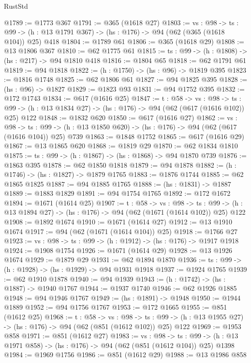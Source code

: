 \begin{lexlean}{RustStd}
\begin{coremodule}
@1789 := @1773 @367
@1791 := @365 (@1618 @27)
@1803 := {vs : @98} ->
  {ts : @99} -> (h : @13 @1791 @367) -> (hs : @176) -> @94 (@62 (@365 (@1618 @104)) @25) @418
@1804 := @1789 @61
@1806 := @365 (@1618 @29)
@1808 := @13 @1806 @367
@1810 := @62 @1775 @61
@1815 := {ts : @99} -> (h : @1808) -> (hs : @217) -> @94 @1810 @418
@1816 := @1804 @65
@1818 := @62 @1791 @61
@1819 := @94 @1818
@1822 := (h : @1750) -> (hs : @96) -> @1819 @395
@1823 := @1816 @1748
@1825 := @62 @1806 @61
@1827 := @94 @1825 @395
@1828 := (hs : @96) -> @1827
@1829 := @1823 @93
@1831 := @94 @1752 @395
@1832 := @172 @1743
@1834 := @617 (@1616 @25)
@1847 := {t : @58} ->
  {vs : @98} ->
  {ts : @99} -> (h : @13 @1834 @27) -> (hs : @176) -> @94 (@62 (@617 (@1616 @102)) @25) @122
@1848 := @1832 @620
@1850 := @617 (@1616 @27)
@1862 := {vs : @98} ->
  {ts : @99} -> (h : @13 @1850 @620) -> (hs : @176) -> @94 (@62 (@617 (@1616 @104)) @25) @739
@1863 := @1848 @1752
@1865 := @617 (@1616 @29)
@1867 := @13 @1865 @620
@1868 := @1819 @29
@1870 := @62 @1834 @1810
@1875 := {ts : @99} -> (h : @1867) -> (hs : @1868) -> @94 @1870 @739
@1876 := @1863 @395
@1878 := @62 @1850 @1818
@1879 := @94 @1878
@1882 := (h : @1746) -> (hs : @1827) -> @1879 @1765
@1883 := @1876 @1744
@1885 := @62 @1865 @1825
@1887 := @94 @1885 @1765
@1888 := (hs : @1831) -> @1887
@1889 := @1883 @1829
@1891 := @94 @1754 @1765
@1892 := @172 @1672
@1894 := @1671 (@1614 @25)
@1907 := {t : @58} ->
  {vs : @98} ->
  {ts : @99} -> (h : @13 @1894 @27) -> (hs : @176) -> @94 (@62 (@1671 (@1614 @102)) @25) @122
@1908 := @1892 @1674
@1910 := @1671 (@1614 @27)
@1912 := @13 @1910 @1674
@1917 := @94 (@62 (@1671 (@1614 @104)) @25)
@1918 := @1766 @27
@1923 := {vs : @98} -> {ts : @99} -> (h : @1912) -> (hs : @176) -> @1917 @1918
@1924 := @1908 @1754
@1926 := @1671 (@1614 @29)
@1928 := @13 @1926 @1674
@1929 := @1879 @29
@1931 := @62 @1894 @1870
@1936 := {ts : @99} -> (h : @1928) -> (hs : @1929) -> @94 @1931 @1918
@1937 := @1924 @1765
@1939 := @62 @1910 @1878
@1940 := @94 @1939
@1943 := (h : @1742) -> (hs : @1887) -> @1940 @1767
@1944 := @1937 @1740
@1946 := @62 @1926 @1885
@1948 := @94 @1946 @1767
@1949 := (hs : @1891) -> @1948
@1950 := @1944 @1889
@1952 := @94 @1756 @1767
@1953 := @172 @1665
@1955 := @851 (@1612 @25)
@1968 := {t : @58} ->
  {vs : @98} ->
  {ts : @99} -> (h : @13 @1955 @27) -> (hs : @176) -> @94 (@62 (@851 (@1612 @102)) @25) @122
@1969 := @1953 @858
@1971 := @851 (@1612 @27)
@1983 := {vs : @98} ->
  {ts : @99} -> (h : @13 @1971 @858) -> (hs : @176) -> @94 (@62 (@851 (@1612 @104)) @25) @1398
@1984 := @1969 @1756
@1986 := @851 (@1612 @29)
@1988 := @13 @1986 @858

\end{coremodule}
\end{lexlean}
